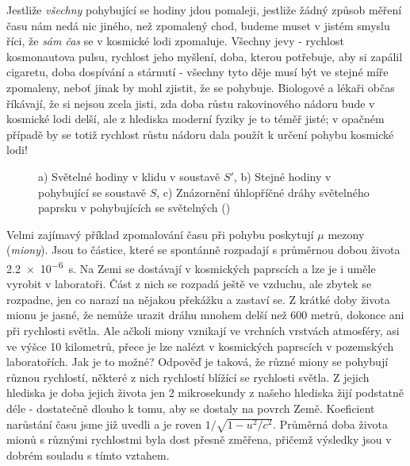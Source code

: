     Jestliže \emph{všechny} pohybující se hodiny jdou pomaleji, jestliže žádný způsob měření času 
    nám nedá nic jiného, než zpomalený chod, budeme muset v jistém smyslu říci, že \emph{sám čas} 
    se v kosmické lodi zpomaluje. Všechny jevy - rychlost kosmonautova pulsu, rychlost jeho 
    myšlení, doba, kterou potřebuje, aby si zapálil cigaretu, doba dospívání a stárnutí - všechny 
    tyto děje musí být ve stejné míře zpomaleny, neboť jinak by mohl zjistit, že se pohybuje. 
    Biologové a lékaři občas říkávají, že si nejsou zcela jisti, zda doba růstu rakovinového nádoru 
    bude v kosmické lodi delší, ale z hlediska moderní fyziky je to téměř jisté; v opačném případě 
    by se totiž rychlost růstu nádoru dala použít k určení pohybu kosmické lodi!
    
    \begin{figure}[ht!]  %
      \centering
           \hspace{1em}
           \newline
      \caption{a) Světelné hodiny v klidu v soustavě \(S'\), b) Stejné hodiny v pohybující se 
               soustavě \(S\), c) Znázornění úhlopříčné dráhy světelného paprsku v pohybujících se
               světelných  (\cite[s.~217]{Feynman01})}
      \label{fyz:fig003}
    \end{figure}
    
    Velmi zajímavý příklad zpomalování času při pohybu poskytují \(\mu\) mezony (\emph{miony}). 
    Jsou to částice, které se spontánně rozpadají s průměrnou dobou života \SI{2.2e-6}{\s}. Na Zemi 
    se dostávají v kosmických paprscích a lze je i uměle vyrobit v laboratoři. Část z nich se 
    rozpadá ještě ve vzduchu, ale zbytek se rozpadne, jen co narazí na nějakou překážku a zastaví 
    se. Z krátké doby života mionu je jasné, že nemůže urazit dráhu mnohem delší než \num{600} 
    metrů, dokonce ani při rychlosti světla. Ale ačkoli miony vznikají ve vrchních vrstvách 
    atmosféry, asi ve výšce \num{10} kilometrů, přece je lze nalézt v kosmických paprscích v 
    pozemských laboratořích. Jak je to možné? Odpověď je taková, že různé miony se pohybují různou 
    rychlostí, některé z nich rychlostí blížící se rychlosti světla. Z jejich hlediska je doba 
    jejich života jen \num{2} mikrosekundy z našeho hlediska žijí podstatně déle - dostatečně 
    dlouho k tomu, aby se dostaly na povrch Země. Koeficient narůstání času jsme již uvedli a je 
    roven \(1/\sqrt{1 - u^2/c^2}\). Průměrná doba života mionů s různými rychlostmi byla dost 
    přesně změřena, přičemž výsledky jsou v dobrém souladu s tímto vztahem.
    
